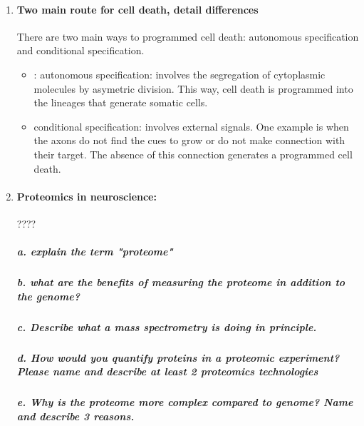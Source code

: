 \documentclass[12pt,article,oneside,a4paper]{memoir}
\begin{document}
\begin{enumerate}
\item \paragraph{Two main route for cell death, detail differences}
There are two main ways to programmed cell death: autonomous specification and conditional specification.
\begin{itemize}
\item: autonomous specification: involves the segregation of cytoplasmic molecules by asymetric division. This way, cell death is programmed into the lineages that generate somatic cells.
\item conditional specification: involves external signals. One example is when the axons do not find the cues to grow or do not make connection with their target. The absence of this connection generates a programmed cell death.
\end{itemize}

\item \paragraph{Proteomics in neuroscience:} ????
\subparagraph{a. explain the term "proteome"}
\subparagraph{b. what are the benefits of measuring the proteome in addition to the genome?}
\subparagraph{c. Describe what a mass spectrometry is doing in principle.}
\subparagraph{d. How would you quantify proteins in a proteomic experiment? Please name and describe at least 2 proteomics technologies}
\subparagraph{e. Why is the proteome more complex compared to genome? Name and describe 3 reasons.}
\end{enumerate}


\end{document}
